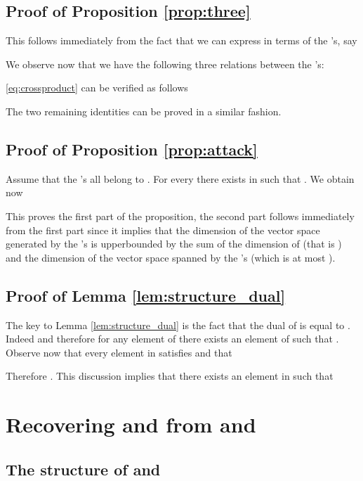 \documentclass[runningheads,11pt]{llncs}
\begin{document}
 \subsection{Proof of Proposition \ref{prop:three}}
 This follows immediately from the fact that we can express
  in terms of the 's, say
 
 We observe now that we have the following three  relations between the 
's:

\eqref{eq:crossproduct} can be verified as follows

The two remaining identities can be proved in a similar fashion.

\subsection{Proof of Proposition \ref{prop:attack}}
Assume that the 's all belong to . For every  there exists
 in  such that .
We obtain now

This proves the first part of the proposition, the second part follows immediately from 
the first part since it implies that the dimension of
the vector space generated by the 's is upperbounded by the
sum of the dimension of  (that is ) and the dimension of the 
vector space spanned by the 's (which is at most ).

\subsection{Proof of Lemma \ref{lem:structure_dual}}

The key to Lemma \ref{lem:structure_dual} is the fact that the
dual of  is equal to 
. Indeed  and therefore for any element 
of  there exists an  element  of  such that 
. Observe now that every element  in  satisfies
 and that

Therefore . This discussion implies that
there exists an element  in  such that
 
 

\newpage
\section{Recovering  and  from  and }
\label{sec:appendix_C}





\subsection{The structure of  and }
\end{document}
